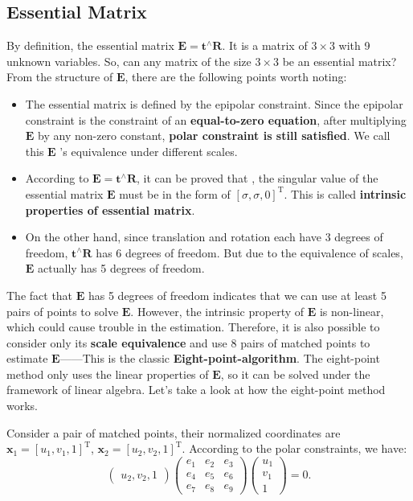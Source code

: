 \subsection{Essential Matrix}
By definition, the essential matrix $\mathbf{E} = \mathbf{t}^\wedge \mathbf{R}$. It is a matrix of $3\times 3$ with 9 unknown variables. So, can any matrix of the size $3 \times 3$ be an essential matrix? From the structure of $\mathbf{E}$, there are the following points worth noting:

\begin{itemize}
	\item The essential matrix is defined by the epipolar constraint. Since the epipolar constraint is the constraint of an \textbf{equal-to-zero equation}, after multiplying $\mathbf{E}$ by any non-zero constant, \textbf{polar constraint is still satisfied}. We call this $\mathbf{E}$ 's equivalence under different scales.
	\item According to $\mathbf{E} = \mathbf{t}^ \wedge \mathbf{R}$, it can be proved that \textsuperscript{\cite{Hartley2003}}, the singular value of the essential matrix $\mathbf{E}$ must be in the form of $[\sigma, \sigma, 0]^\mathrm{T}$. This is called \textbf{intrinsic properties of essential matrix}.
	\item On the other hand, since translation and rotation each have 3 degrees of freedom, $\mathbf{t}^\wedge \mathbf{R}$ has 6 degrees of freedom. But due to the equivalence of scales, $\mathbf{E}$ actually has 5 degrees of freedom.
\end{itemize}

The fact that $\mathbf{E}$ has 5 degrees of freedom indicates that we can use at least 5 pairs of points to solve $\mathbf{E}$. However, the intrinsic property of $\mathbf{E}$ is non-linear, which could cause trouble in the estimation. Therefore, it is also possible to consider only its \textbf{scale equivalence} and use 8 pairs of matched points to estimate $\mathbf{E}$——This is the classic \textbf{Eight-point-algorithm}\textsuperscript{\cite{Hartley1997, Longuet-Higgins1987}}. The eight-point method only uses the linear properties of $\mathbf{E}$, so it can be solved under the framework of linear algebra. Let's take a look at how the eight-point method works.

Consider a pair of matched points, their normalized coordinates are $\mathbf{x}_{1}=[u_{1},v_{1},1]^\mathrm{T}$, $\mathbf{x}_{2}=[u_{2},v_{2},1]^{\mathrm{T}}$. According to the polar constraints, we have:
\begin{equation}
\begin{pmatrix} 
u_{2},v_{2},1
\end{pmatrix}
\begin{pmatrix}
 e_{1} & e_{2} & e_{3}\\ 
 e_{4} & e_{5} & e_{6}\\ 
 e_{7} & e_{8} & e_{9} 
\end{pmatrix}
\begin{pmatrix} 
u_{1}\\v_{1}\\1
\end{pmatrix}
=0.
\end{equation}

